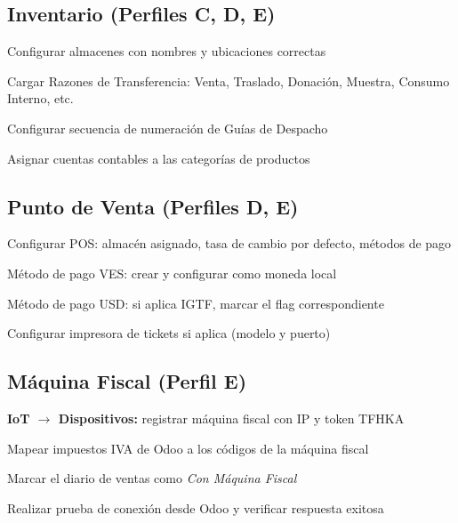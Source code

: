 \documentclass[11pt,a4paper]{article}
\begin{document}
\begin{Form}
\subsection{Inventario (Perfiles C, D, E)}

\begin{checklist}
  \item Configurar almacenes con nombres y ubicaciones correctas
  \item Cargar Razones de Transferencia: Venta, Traslado, Donación, Muestra, Consumo Interno, etc.
  \item Configurar secuencia de numeración de Guías de Despacho
  \item Asignar cuentas contables a las categorías de productos
\end{checklist}

\subsection{Punto de Venta (Perfiles D, E)}

\begin{checklist}
  \item Configurar POS: almacén asignado, tasa de cambio por defecto, métodos de pago
  \item Método de pago VES: crear y configurar como moneda local
  \item Método de pago USD: si aplica IGTF, marcar el flag correspondiente
  \item Configurar impresora de tickets si aplica (modelo y puerto)
\end{checklist}

\subsection{Máquina Fiscal (Perfil E)}

\begin{checklist}
  \item \textbf{IoT $\rightarrow$ Dispositivos:} registrar máquina fiscal con IP y token TFHKA
  \item Mapear impuestos IVA de Odoo a los códigos de la máquina fiscal
  \item Marcar el diario de ventas como \emph{Con Máquina Fiscal}
  \item Realizar prueba de conexión desde Odoo y verificar respuesta exitosa
\end{checklist}

\clearpage


\end{Form}
\end{document}
